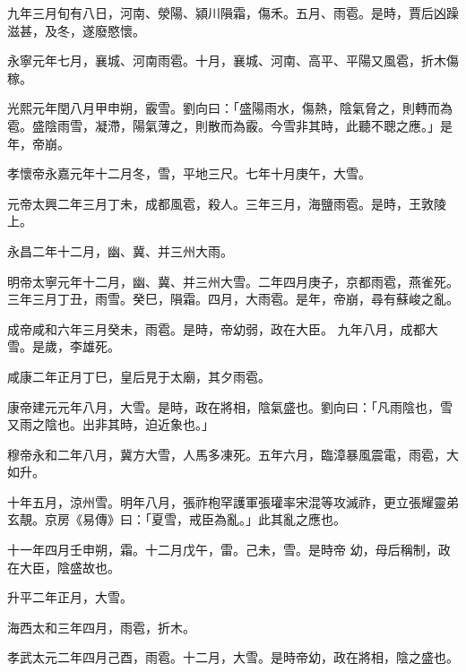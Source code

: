\begin{pinyinscope}
 九年三月旬有八日，河南、滎陽、潁川隕霜，傷禾。五月、雨雹。是時，賈后凶躁滋甚，及冬，遂廢愍懷。



 永寧元年七月，襄城、河南雨雹。十月，襄城、河南、高平、平陽又風雹，折木傷稼。



 光熙元年閏八月甲申朔，霰雪。劉向曰：「盛陽雨水，傷熱，陰氣脅之，則轉而為雹。盛陰雨雪，凝滯，陽氣薄之，則散而為霰。今雪非其時，此聽不聰之應。」是年，帝崩。



 孝懷帝永嘉元年十二月冬，雪，平地三尺。七年十月庚午，大雪。



 元帝太興二年三月丁未，成都風雹，殺人。三年三月，海鹽雨雹。是時，王敦陵上。



 永昌二年十二月，幽、冀、并三州大雨。



 明帝太寧元年十二月，幽、冀、并三州大雪。二年四月庚子，京都雨雹，燕雀死。三年三月丁丑，雨雪。癸巳，隕霜。四月，大雨雹。是年，帝崩，尋有蘇峻之亂。



 成帝咸和六年三月癸未，雨雹。是時，帝幼弱，政在大臣。
 九年八月，成都大雪。是歲，李雄死。



 咸康二年正月丁巳，皇后見于太廟，其夕雨雹。



 康帝建元元年八月，大雪。是時，政在將相，陰氣盛也。劉向曰：「凡雨陰也，雪又雨之陰也。出非其時，迫近象也。」



 穆帝永和二年八月，冀方大雪，人馬多凍死。五年六月，臨漳暴風震電，雨雹，大如升。



 十年五月，涼州雪。明年八月，張祚枹罕護軍張瓘率宋混等攻滅祚，更立張耀靈弟玄靚。京房《易傳》曰：「夏雪，戒臣為亂。」此其亂之應也。



 十一年四月壬申朔，霜。十二月戊午，雷。己未，雪。是時帝
 幼，母后稱制，政在大臣，陰盛故也。



 升平二年正月，大雪。



 海西太和三年四月，雨雹，折木。



 孝武太元二年四月己酉，雨雹。十二月，大雪。是時帝幼，政在將相，陰之盛也。




\end{pinyinscope}
